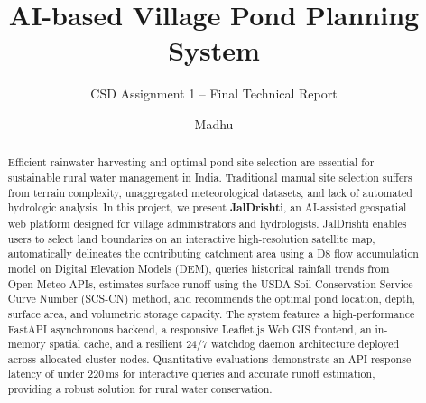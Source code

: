 \documentclass[manuscript,screen,review]{acmart}
\begin{document}
\title{AI-based Village Pond Planning System}
\subtitle{CSD Assignment 1 -- Final Technical Report}

\author{Madhu}

\renewcommand{\shortauthors}{Madhu}

\begin{abstract}
Efficient rainwater harvesting and optimal pond site selection are essential for sustainable rural water management in India. Traditional manual site selection suffers from terrain complexity, unaggregated meteorological datasets, and lack of automated hydrologic analysis. In this project, we present \textbf{JalDrishti}, an AI-assisted geospatial web platform designed for village administrators and hydrologists. JalDrishti enables users to select land boundaries on an interactive high-resolution satellite map, automatically delineates the contributing catchment area using a D8 flow accumulation model on Digital Elevation Models (DEM), queries historical rainfall trends from Open-Meteo APIs, estimates surface runoff using the USDA Soil Conservation Service Curve Number (SCS-CN) method, and recommends the optimal pond location, depth, surface area, and volumetric storage capacity. The system features a high-performance FastAPI asynchronous backend, a responsive Leaflet.js Web GIS frontend, an in-memory spatial cache, and a resilient 24/7 watchdog daemon architecture deployed across allocated cluster nodes. Quantitative evaluations demonstrate an API response latency of under 220\,ms for interactive queries and accurate runoff estimation, providing a robust solution for rural water conservation.
\end{abstract}


\maketitle

\end{document}
